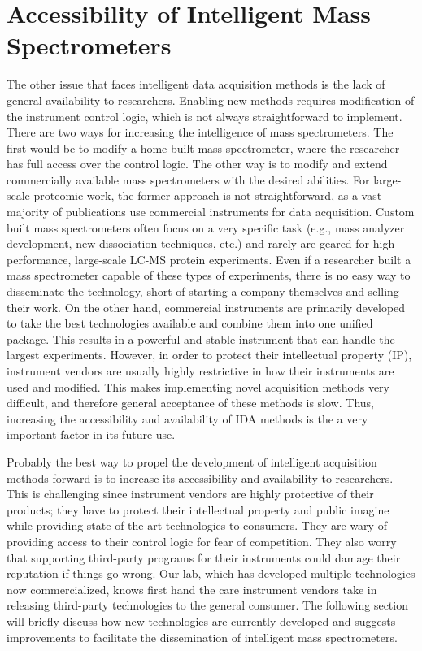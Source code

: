 \section{Accessibility of Intelligent Mass Spectrometers}
The other issue that faces intelligent data acquisition methods is the lack of general availability to researchers. Enabling new methods requires modification of the instrument control logic, which is not always straightforward to implement. There are two ways for increasing the intelligence of mass spectrometers. The first would be to modify a home built mass spectrometer, where the researcher has full access over the control logic. The other way is to modify and extend commercially available mass spectrometers with the desired abilities. For large-scale proteomic work, the former approach is not straightforward, as a vast majority of publications use commercial instruments for data acquisition. Custom built mass spectrometers often focus on a very specific task (e.g., mass analyzer development, new dissociation techniques, etc.) and rarely are geared for high-performance, large-scale LC-MS protein experiments. Even if a researcher built a mass spectrometer capable of these types of experiments, there is no easy way to disseminate the technology, short of starting a company themselves and selling their work. On the other hand, commercial instruments are primarily developed to take the best technologies available and combine them into one unified package. This results in a powerful and stable instrument that can handle the largest experiments. However, in order to protect their intellectual property (IP), instrument vendors are usually highly restrictive in how their instruments are used and modified. This makes implementing novel acquisition methods very difficult, and therefore general acceptance of these methods is slow. Thus, increasing the accessibility and availability of IDA methods is the a very important factor in its future use.

Probably the best way to propel the development of intelligent acquisition methods forward is to increase its accessibility and availability to researchers. This is challenging since instrument vendors are highly protective of their products; they have to protect their intellectual property and public imagine while providing state-of-the-art technologies to consumers. They are wary of providing access to their control logic for fear of competition. They also worry that supporting third-party programs for their instruments could damage their reputation if things go wrong. Our lab, which has developed multiple technologies now commercialized, knows first hand the care instrument vendors take in releasing third-party technologies to the general consumer. The following section will briefly discuss how new technologies are currently developed and suggests improvements to facilitate the dissemination of intelligent mass spectrometers.  

